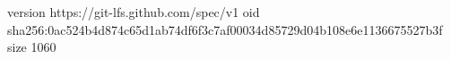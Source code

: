 version https://git-lfs.github.com/spec/v1
oid sha256:0ac524b4d874c65d1ab74df6f3c7af00034d85729d04b108e6e1136675527b3f
size 1060
